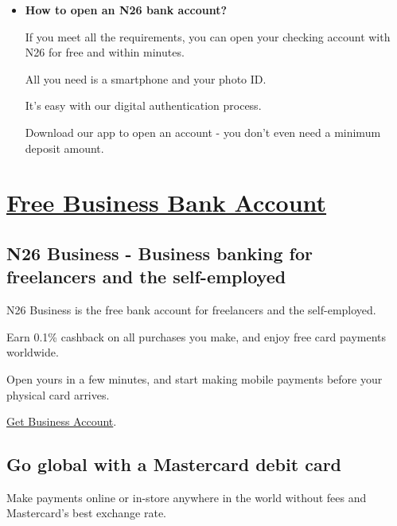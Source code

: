 \documentclass[onsided]{book}
\numberwithin{equation}{section}
\begin{document}
\begin{itemize}
    An N26 You bank account costs €9.90 per month, and the N26 Metal account costs €16.90 per month.
    
    If you opt for a N26 premium account, you commit to at least 12 months.
    
    You don't need a steady income or a minimum deposit to open an account.
    
    Up to €50,000 balance, after which a custody fee may apply.
    
    \href{https://n26.com/en-eu/legal-documents}{Terms \& Conditions}.
    \item \textbf{How to open an N26 bank account?}
    
    If you meet all the requirements, you can open your checking account with N26 for free and within minutes.
    
    All you need is a smartphone and your photo ID.
    
    It's easy with our digital authentication process.
    
    Download our app to open an account - you don't even need a minimum deposit amount.
\end{itemize}


\chapter{\href{https://n26.com/en-eu/free-business-bank-account}{Free Business Bank Account}}

\section{N26 Business - Business banking for freelancers and the self-employed}
N26 Business is the free bank account for freelancers and the self-employed.

Earn 0.1\% cashback on all purchases you make, and enjoy free card payments worldwide.

Open yours in a few minutes, and start making mobile payments before your physical card arrives.

\href{https://get.n26.com/?ch=businessAccountPage&pr=n26Business&_ga=2.74032722.1189510936.1611884241-1079622474.1611780638}{Get Business Account}.

\section{Go global with a Mastercard debit card}
Make payments online or in-store anywhere in the world without fees and Mastercard's best exchange rate.
\end{document}
